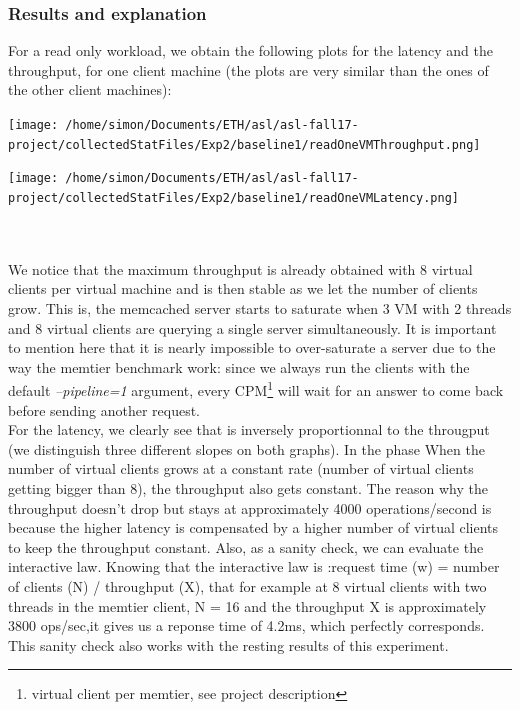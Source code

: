 \documentclass[11pt,a4paper]{article}
\begin{document}
\subsubsection{Results and explanation}
For a read only workload, we obtain the following plots for the latency and the throughput, for one client machine (the plots are very similar than the ones of the other client machines):
\\
\begin{minipage}{0.5\linewidth}
\texttt{[image: /home/simon/Documents/ETH/asl/asl-fall17-project/collectedStatFiles/Exp2/baseline1/readOneVMThroughput.png]}
\end{minipage}
\hfill
\begin{minipage}{0.5\linewidth}
\texttt{[image: /home/simon/Documents/ETH/asl/asl-fall17-project/collectedStatFiles/Exp2/baseline1/readOneVMLatency.png]}
\end{minipage}
\\\\
We notice that the maximum throughput is already obtained with 8 virtual clients per virtual machine and is then stable as we let the number of clients grow. This is, the memcached server starts to saturate when 3 VM with 2 threads and 8 virtual clients are querying a single server simultaneously. It is important to mention here that it is nearly impossible to over-saturate a server due to the way the memtier benchmark work: since we always run the clients with the default \textit{--pipeline=1} argument, every CPM\footnote{virtual client per memtier, see project description} will wait for an answer to come back before sending another request.
\\
For the latency, we clearly see that is inversely proportionnal to the througput (we distinguish three different slopes on both graphs). In the phase When the number of virtual clients grows at a constant rate (number of virtual clients getting bigger than 8), the throughput also gets constant. The reason why the throughput doesn't drop but stays at approximately 4000 operations/second is because the higher latency is compensated by a higher number of virtual clients to keep the throughput constant. Also, as a sanity check, we can evaluate the interactive law. Knowing that the interactive law is :request time (w) = number of clients (N) / throughput (X), that for example at 8 virtual clients with two threads in the memtier client, N = 16 and the throughput X is approximately 3800 ops/sec,it gives us a reponse time of 4.2ms, which perfectly corresponds. This sanity check also works with the resting results of this experiment. 
\end{document}
